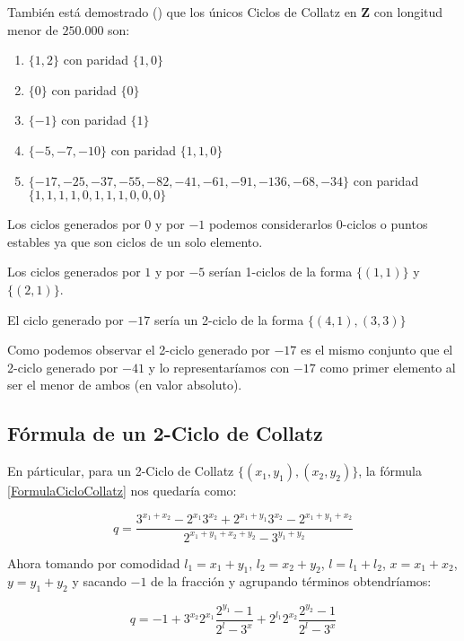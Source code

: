 También está demostrado (\cite{Lagarias1990}) que los únicos Ciclos de Collatz en $\mathbf{Z}$ con longitud menor de $250.000$ son:
\begin{enumerate}
    \item $\{ {1, 2} \}$ con paridad $\{ 1, 0 \}$
    \item $\{ {0} \}$ con paridad $\{ 0 \}$
    \item $\{ {-1} \}$ con paridad $\{ 1 \}$
    \item $\{ {-5, -7, -10} \}$ con paridad $\{ 1, 1, 0 \}$
    \item $\{ {-17, -25, -37, -55, -82, -41, -61, -91, -136, -68, -34} \}$ con paridad $\{ 1, 1, 1, 1, 0, 1, 1, 1, 0, 0, 0 \}$
\end{enumerate}

Los ciclos generados por $0$ y por $-1$ podemos considerarlos 0-ciclos o puntos estables ya que son ciclos de un solo elemento.

Los ciclos generados por $1$ y por $-5$ serían 1-ciclos de la forma $\{ (1,1) \}$ y $\{ (2,1) \}$.

El ciclo generado por $-17$ sería un 2-ciclo de la forma $\{ (4,1), (3,3) \}$

Como podemos observar el 2-ciclo generado por $-17$ es el mismo conjunto que el 2-ciclo generado por $-41$ y lo representaríamos con $-17$ como primer elemento al ser el menor de ambos (en valor absoluto).



\subsection{Fórmula de un 2-Ciclo de Collatz}
En párticular, para un 2-Ciclo de Collatz $\{ (x_1, y_1),(x_2,y_2) \}$, la fórmula \ref{FormulaCicloCollatz} nos quedaría como:

\begin{equation}
    \label{Formula2CicloCollatz}
        q = \frac{3^{x_1+x_2} - 2^{x_1}3^{x_2} + 2^{x_1+y_1}3^{x_2} - 2^{x_1+y_1+x_2}  }{2^{x_1+y_1+x_2+y_2}-3^{y_1+y_2} }
\end{equation}

Ahora tomando por comodidad $l_1 = x_1 + y_1$, $l_2 = x_2 + y_2$, $l=l_1+l_2$, $x=x_1+x_2$, $y=y_1+y_2$ y sacando $-1$ de la fracción y agrupando términos obtendríamos:

\begin{equation}
    \label{Formula2CicloCollatzAlterna}
        q = -1 + 3^{x_2}2^{x_1} \frac{2^{y_1} - 1}{2^l-3^x} + 2^{l_1}2^{x_2} \frac{2^{y_2}-1}{2^l-3^x}
\end{equation}

